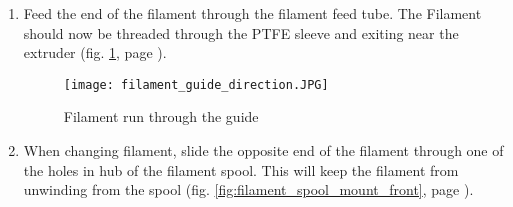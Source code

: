 \begin{enumerate}
\item Feed the end of the filament through the filament feed tube. The Filament should now be threaded through the PTFE sleeve and exiting near the extruder (fig. \ref{fig:filament_in_guide}, page \pageref{fig:filament_in_guide}).

\begin{figure}[H]
\centering
\texttt{[image: filament\_guide\_direction.JPG]}
\caption{Filament run through the guide}
\label{fig:filament_in_guide}
\end{figure}

\item When changing filament, slide the opposite end of the filament through one of the holes in hub of the filament spool. This will keep the filament from unwinding from the spool (fig. \ref{fig:filament_spool_mount_front}, page \pageref{fig:filament_spool_mount_front}).

\end{enumerate}
